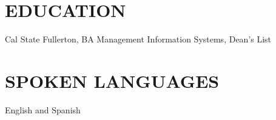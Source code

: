 \documentclass{res}
\begin{document}
\begin{resume}
\section{EDUCATION}
Cal State Fullerton, BA Management Information Systems, Dean's List

\section{SPOKEN LANGUAGES}
English and Spanish
\end{resume}
\end{document}
